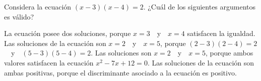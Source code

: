 \documentclass[
  titulo=Prueba,
  subtitulo=Álgebra y funciones,
  curso=Tercero medio A,
  fecha=2025-09-23,
  con nombre,
  ppp=1
]{srs3}
\begin{document}
\begin{preguntas}
\pregunta Considera la ecuación \( \left(x-3\right)\left(x-4\right)=2 \). ¿Cuál de los siguientes argumentos es válido?
\begin{alternativas}
\alternativa La ecuación posee dos soluciones, porque \(x=3\)~~y~~\(x=4\) satisfacen la igualdad.
\alternativa Las soluciones de la ecuación son \(x=2\)~~y~~\(x=5\), porque \( \left(2-3\right)\left(2-4\right)=2 \)~~y~~\( \left(5-3\right)\left(5-4\right)=2 \).
\alternativa Las soluciones son \(x=2\)~~y~~\(x=5\), porque ambos valores satisfacen la ecuación \( x^2-7x+12=0 \).
\alternativa Las soluciones de la ecuación son ambas positivas, porque el discriminante asociado a la ecuación es positivo.
\end{alternativas}

%

\end{preguntas}
\end{document}
